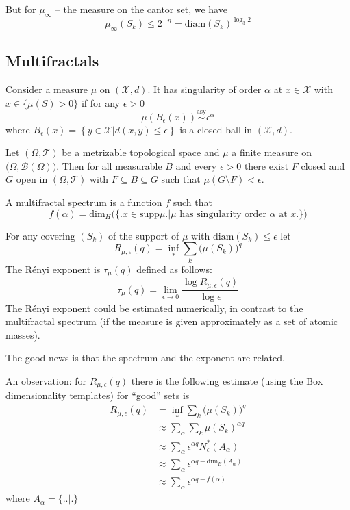 \documentclass[a4paper]{article}
\newcommand{\obj}[1]{{\left\{ #1 \right \}}}
\newcommand{\induc}[1]{{\left . #1 \right \vert}}
\newcommand{\Xcal}{\mathcal{X}}
\newcommand{\Tcal}{\mathcal{T}}
\newcommand{\borel}{\mathcal{B}}
\begin{document}
But for $\mu_\infty$ -- the measure on the cantor set, we have 
\[\mu_\infty(S_k) \leq 2^{-n} = \text{diam}(S_k)^{\log_3 2}\]

\subsection{Multifractals} %
\label{sub:multifractals}

Consider a measure $\mu$ on $(\Xcal, d)$. It has singularity of order $\alpha$ at $x\in \Xcal$ with $x\in \{\mu(S)>0\}$ if for any $\epsilon>0$
\[\mu(B_\epsilon(x)) \overset{\text{asy}}{\sim} \epsilon^\alpha\]
where $B_\epsilon(x) = \obj{\induc{y\in \Xcal}d(x,y)\leq\epsilon}$ is a closed ball in $(\Xcal, d)$.

Let $(\Omega, \Tcal)$ be a metrizable topological space and $\mu$ a finite measure on $\big(\Omega, \borel(\Omega)\big)$. Then for all measurable $B$ and every $\epsilon>0$ there exist $F$ closed and $G$ open in $(\Omega, \Tcal)$ with $F\subseteq B \subseteq G$ such that $\mu(G\setminus F) < \epsilon$.

A multifractal spectrum is a function $f$ such that 
\[f(\alpha) = \text{dim}_H\Big(\big\{\big. x\in \text{supp}\mu\big.\big\rvert \mu \text{ has singularity order } \alpha \text{ at } x \big.\big\}\Big)\]

For any covering $(S_k)$ of the support of $\mu$ with $\text{diam}(S_k)\leq \epsilon$ let
\[R_{\mu,\epsilon}(q) = \inf_* \sum_k \big(\mu(S_k)\big)^q\]
The R\'enyi exponent is $\tau_\mu(q)$ defined as follows:
\[\tau_\mu(q) = \lim_{\epsilon\to 0} \frac{\log R_{\mu,\epsilon}(q) }{\log \epsilon}\]
The R\'enyi exponent could be estimated numerically, in contrast to the multifractal spectrum (if the measure is given approximately as a set of atomic masses).

The good news is that the spectrum and the exponent are related.

An observation: for $R_{\mu,\epsilon}(q)$ there is the following estimate (using the Box dimensionality templates) for ``good'' sets is
\begin{align*}
	R_{\mu,\epsilon}(q)
	&= \inf_* \sum_k \big(\mu(S_k)\big)^q \\
	&\approx \sum_\alpha \sum_k \mu(S_k)^{\alpha q} \\
	&\approx \sum_\alpha \epsilon^{\alpha q} N^*_\epsilon(A_\alpha) \\
	&\approx \sum_\alpha \epsilon^{\alpha q - \text{dim}_B(A_\alpha)}\\
	&\approx \sum_\alpha \epsilon^{\alpha q - f(\alpha)}
\end{align*}
where $A_\alpha = \Big\{\Big. \Big.\Big\rvert \Big.\Big\}$
\end{document}
